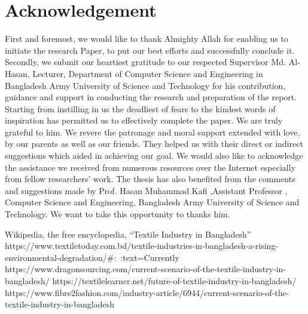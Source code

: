 \documentclass[conference]{IEEEtran}
\begin{document}
\section*{Acknowledgement}

First and foremost, we would like to thank Almighty Allah for enabling us to initiate the research Paper, to put our best efforts and successfully conclude it. Secondly, we submit our heartiest gratitude to our respected Supervisor Md. Al-Hasan, Lecturer, Department of Computer Science and Engineering in Bangladesh Army University of Science and Technology for his contribution, guidance and support in conducting the research and preparation of the report. Starting from instilling in us the deadliest of fears to the kindest words of inspiration has permitted us to effectively complete the paper. We are truly grateful to him. We revere the patronage and moral support extended with love, by our parents as well as our friends. They helped us with their direct or indirect suggestions which aided in achieving our goal. We would also like to acknowledge the assistance we received from numerous resources over the Internet especially from fellow researchers’ work.
The thesis has also benefited from the comments and suggestions made by Prof. Hasan Muhammad Kafi ,Assistant Professor , Computer Science and Engineering, Bangladesh Army University of Science and Technology. We want to take this opportunity to thanks him.


\begin{thebibliography}{00}
 Wikipedia, the free encyclopedia, ``Textile Industry in Bangladesh'' 
 https://www.textiletoday.com.bd/textile-industries-in-bangladesh-a-rising-environmental-degradation/#:~:text=Currently%
 https://www.dragonsourcing.com/current-scenario-of-the-textile-industry-in-bangladesh/
 https://textilelearner.net/future-of-textile-industry-in-bangladesh/
https://www.fibre2fashion.com/industry-article/6944/current-scenario-of-the-textile-industry-in-bangladesh

\end{thebibliography}
\vspace{12pt}
\end{document}
